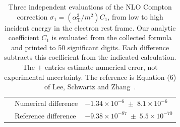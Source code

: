 \begin{table}[!htbp]
\begin{tabular}{rll}
 & Numerical difference & $-1.34\times10^{-6}\;\pm\;8.1\times10^{-6}$ \\
 & Reference difference & $-9.38\times10^{-87}\;\pm\;5.5\times10^{-70}$ \\
\bottomrule
\end{tabular}
\caption{Three independent evaluations of the NLO Compton correction
$\sigma_1=(\alpha_{\mathrm T}^3/m^2)C_1$, from low to high incident
energy in the electron rest frame. Our analytic coefficient $C_1$ is
evaluated from the collected formula and printed to 50 significant digits. Each difference subtracts this
coefficient from the indicated calculation. The $\pm$ entries estimate
numerical error, not experimental uncertainty. The reference is
Equation (6) of Lee, Schwartz and Zhang~\cite{qed-processes-lsz}.}
\label{tab:comp-independent-total-50}
\end{table}
